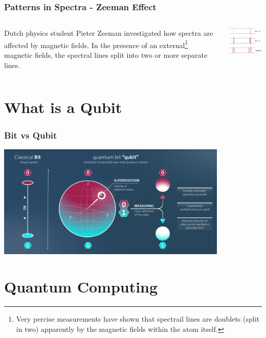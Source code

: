 \documentclass{beamer}
\begin{document}
\begin{frame}\frametitle{Patterns in Spectra - Zeeman Effect}
\begin{columns}
\begin{column}{6.5cm}
Dutch physics student Pieter Zeeman investigated how spectra are affected by magnetic fields. In the presence of an external\footnote{Very percise measurements have shown that spectrail lines are doublets (split in two) apparently by the magnetic fields within the atom itself.} magnetic fields, the spectral lines split into two or more separate lines.
\end{column}
\begin{column}{5cm}
\begin{center}
\includegraphics[width=5cm]{fig/zeeman1.jpg}
\end{center}
\end{column}
\end{columns}
\end{frame}


\section{What is a Qubit}

\begin{frame} \frametitle{Bit vs Qubit}
\begin{center}
\includegraphics[width=11cm]{fig/bitQubit.png}
\end{center}

\end{frame}

\section{Quantum Computing}
\end{document}
